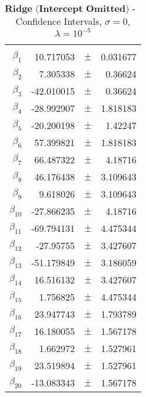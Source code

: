 \documentclass[...,numrefs]{wiley-article}
\begin{document}
\begin{table}[h]
    \centering
    \caption{$\textbf{Ridge (Intercept Omitted) - Franke Function:}$ Confidence Intervals, $\sigma = 0$, $\lambda = 10^{-5}$}
    \begin{tabular}{rrrr}
    \hline
    \\
    $\beta_{1}$ & 10.717053 & $\pm$ & 0.031677 \\
    $\beta_{2}$ & 7.305338 & $\pm$ & 0.36624 \\
    $\beta_{3}$ & -42.010015 & $\pm$ & 0.36624 \\
    $\beta_{4}$ & -28.992907 & $\pm$ & 1.818183 \\
    $\beta_{5}$ & -20.200198 & $\pm$ & 1.42247 \\
    $\beta_{6}$ & 57.399821 & $\pm$ & 1.818183 \\
    $\beta_{7}$ & 66.487322 & $\pm$ & 4.18716 \\
    $\beta_{8}$ & 46.176438 & $\pm$ & 3.109643 \\
    $\beta_{9}$ & 9.618026 & $\pm$ & 3.109643 \\
    $\beta_{10}$ & -27.866235 & $\pm$ & 4.18716 \\
    $\beta_{11}$ & -69.794131 & $\pm$ & 4.475344 \\
    $\beta_{12}$ & -27.95755 & $\pm$ & 3.427607 \\
    $\beta_{13}$ & -51.179849 & $\pm$ & 3.186059 \\
    $\beta_{14}$ & 16.516132 & $\pm$ & 3.427607 \\
    $\beta_{15}$ & 1.756825 & $\pm$ & 4.475344 \\
    $\beta_{16}$ & 23.947743 & $\pm$ & 1.793789 \\
    $\beta_{17}$ & 16.180055 & $\pm$ & 1.567178 \\
    $\beta_{18}$ & 1.662972 & $\pm$ & 1.527961 \\
    $\beta_{19}$ & 23.519894 & $\pm$ & 1.527961 \\
    $\beta_{20}$ & -13.083343 & $\pm$ & 1.567178 \\
    \hline
    \end{tabular}

    \label{tab:my_label}
\end{table}
\end{document}
